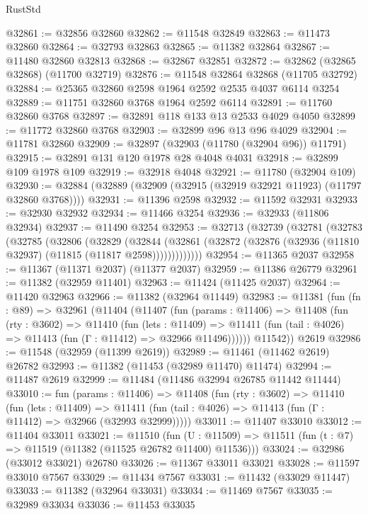 \begin{lexlean}{RustStd}
\begin{coremodule}
@32861 := @32856 @32860
@32862 := @11548 @32849
@32863 := @11473 @32860
@32864 := @32793 @32863
@32865 := @11382 @32864
@32867 := @11480 @32860 @32813
@32868 := @32867 @32851
@32872 := @32862 (@32865 @32868) (@11700 @32719)
@32876 := @11548 @32864 @32868 (@11705 @32792)
@32884 := @25365 @32860 @2598 @1964 @2592 @2535 @4037 @6114 @3254
@32889 := @11751 @32860 @3768 @1964 @2592 @6114
@32891 := @11760 @32860 @3768
@32897 := @32891 @118 @133 @13 @2533 @4029 @4050
@32899 := @11772 @32860 @3768
@32903 := @32899 @96 @13 @96 @4029
@32904 := @11781 @32860
@32909 := @32897 (@32903 (@11780 (@32904 @96)) @11791)
@32915 := @32891 @131 @120 @1978 @28 @4048 @4031
@32918 := @32899 @109 @1978 @109
@32919 := @32918 @4048
@32921 := @11780 (@32904 @109)
@32930 := @32884 (@32889 (@32909 (@32915 (@32919 @32921 @11923) (@11797 @32860 @3768))))
@32931 := @11396 @2598
@32932 := @11592 @32931
@32933 := @32930 @32932
@32934 := @11466 @3254
@32936 := @32933 (@11806 @32934)
@32937 := @11490 @3254
@32953 := @32713
    (@32739
      (@32781
        (@32783
          (@32785
            (@32806
              (@32829
                (@32844
                  (@32861 (@32872 (@32876 (@32936 (@11810 @32937) (@11815 (@11817 @2598)))))))))))))
@32954 := @11365 @2037
@32958 := @11367 (@11371 @2037) (@11377 @2037)
@32959 := @11386 @26779
@32961 := @11382 (@32959 @11401)
@32963 := @11424 (@11425 @2037)
@32964 := @11420 @32963
@32966 := @11382 (@32964 @11449)
@32983 := @11381
    (fun (fn : @89) =>
    @32961
      (@11404
        (@11407
          (fun (params : @11406) =>
          @11408
            (fun (rty : @3602) =>
            @11410
              (fun (lets : @11409) =>
              @11411 (fun (tail : @4026) => @11413 (fun (Γ : @11412) => @32966 @11496))))))
        @11542))
    @2619
@32986 := @11548 (@32959 (@11399 @2619))
@32989 := @11461 (@11462 @2619) @26782
@32993 := @11382 (@11453 (@32989 @11470) @11474)
@32994 := @11487 @2619
@32999 := @11484 (@11486 @32994 @26785 @11442 @11444)
@33010 := fun (params : @11406) =>
  @11408
    (fun (rty : @3602) =>
    @11410
      (fun (lets : @11409) =>
      @11411 (fun (tail : @4026) => @11413 (fun (Γ : @11412) => @32966 (@32993 @32999)))))
@33011 := @11407 @33010
@33012 := @11404 @33011
@33021 := @11510
    (fun (U : @11509) => @11511 (fun (t : @7) => @11519 (@11382 (@11525 @26782 @11400) @11536)))
@33024 := @32986 (@33012 @33021) @26780
@33026 := @11367 @33011 @33021
@33028 := @11597 @33010 @7567
@33029 := @11434 @7567
@33031 := @11432 (@33029 @11447)
@33033 := @11382 (@32964 @33031)
@33034 := @11469 @7567
@33035 := @32989 @33034
@33036 := @11453 @33035

\end{coremodule}
\end{lexlean}
